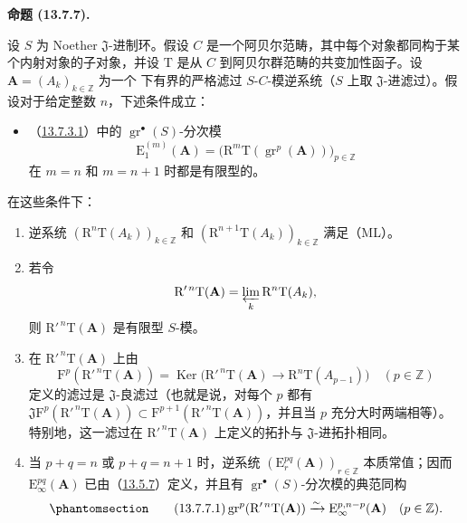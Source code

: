 \documentclass[UTF8,fontset=none,11pt,oneside,openany]{ctexbook}
\newenvironment{proposition}[1][]{%
  \par\medskip\noindent\textbf{命题 (#1).}\ %
}{\par}
\newcommand{\oldpage}[2][]{%
  \hypertarget{ega-source-page-#1-#2}{}%
  \marginnote{\scriptsize\textbf{#1}~|~#2}\ignorespaces}
\let\EGAOriginalLabel\label
\renewcommand{\label}[1]{\phantomsection\EGAOriginalLabel{#1}}
\begin{document}
\begin{proposition}[13.7.7]
\label{0.13.7.7-fr}
设 $S$ 为 Noether $\mathfrak J$-进制环。假设 $C$ 是一个阿贝尔范畴，其中每个对象都同构于某个内射对象的子对象，并设
$\mathrm T$ 是从 $C$ 到阿贝尔群范畴的共变加性函子。设
$\mathbf A=(A_k)_{k\in\mathbb Z}$ 为一个
\oldpage[0\textsubscript{III}]{78}
下有界的严格滤过 $S$-$C$-模逆系统（$S$ 上取 $\mathfrak J$-进滤过）。假设对于给定整数
$n$，下述条件成立：
\begin{itemize}
\item[$(\mathrm F_n)$] （\hyperref[0.13.7.3.1-fr]{13.7.3.1}）中的
$\operatorname{gr}^\bullet(S)$-分次模
\[
\mathrm E_1^{(m)}(\mathbf A)=
\bigl(\mathrm R^m\mathrm T(\operatorname{gr}^p(\mathbf A))\bigr)_{p\in\mathbb Z}
\]
在 $m=n$ 和 $m=n+1$ 时都是有限型的。
\end{itemize}
在这些条件下：
\begin{enumerate}
\item[\rm(i)] 逆系统
$(\mathrm R^n\mathrm T(A_k))_{k\in\mathbb Z}$ 和
$(\mathrm R^{n+1}\mathrm T(A_k))_{k\in\mathbb Z}$ 满足（ML）。
\item[\rm(ii)] 若令
\[
\mathrm R'^{\,n}\mathrm T(\mathbf A)=
\varprojlim_k\mathrm R^n\mathrm T(A_k),
\]
则 $\mathrm R'^{\,n}\mathrm T(\mathbf A)$ 是有限型 $S$-模。
\item[\rm(iii)] 在 $\mathrm R'^{\,n}\mathrm T(\mathbf A)$ 上由
\[
\mathrm F^p(\mathrm R'^{\,n}\mathrm T(\mathbf A))=
\operatorname{Ker}\bigl(\mathrm R'^{\,n}\mathrm T(\mathbf A)
\longrightarrow\mathrm R^n\mathrm T(A_{p-1})\bigr)
\quad(p\in\mathbb Z)
\]
定义的滤过是 $\mathfrak J$-良滤过（也就是说，对每个 $p$ 都有
$\mathfrak J\mathrm F^p(\mathrm R'^{\,n}\mathrm T(\mathbf A))
\subset\mathrm F^{p+1}(\mathrm R'^{\,n}\mathrm T(\mathbf A))$，并且当 $p$ 充分大时两端相等）。特别地，这一滤过在
$\mathrm R'^{\,n}\mathrm T(\mathbf A)$ 上定义的拓扑与 $\mathfrak J$-进拓扑相同。
\item[\rm(iv)] 当 $p+q=n$ 或 $p+q=n+1$ 时，逆系统
$(\mathrm E_r^{pq}(\mathbf A))_{r\in\mathbb Z}$ 本质常值；因而
$\mathrm E_\infty^{pq}(\mathbf A)$ 已由（\hyperref[0.13.5.7-fr]{13.5.7}）定义，并且有
$\operatorname{gr}^\bullet(S)$-分次模的典范同构
\begin{equation}
\label{0.13.7.7.1-fr}
\tag{13.7.7.1}
\operatorname{gr}^p(\mathrm R'^{\,n}\mathrm T(\mathbf A))
\xrightarrow{\sim}\mathrm E_\infty^{p,n-p}(\mathbf A)
\quad(p\in\mathbb Z).
\end{equation}
\end{enumerate}
\end{proposition}
\end{document}
